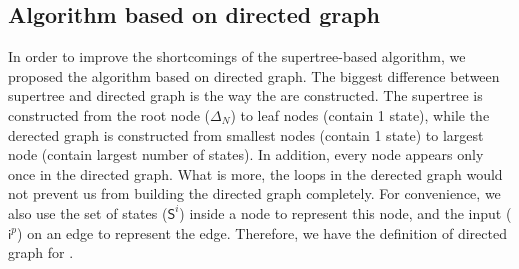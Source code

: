 \subsection{Algorithm based on directed graph}
In order to improve the shortcomings of the supertree-based algorithm, we proposed the algorithm based on directed graph. The biggest difference between supertree and directed graph is the way the are constructed. The supertree is constructed from the root node ($\Delta_N$) to leaf nodes (contain 1 state), while the derected graph is constructed from smallest nodes (contain 1 state) to largest node (contain largest number of states). In addition, every node appears only once in the directed graph. What is more, the loops in the derected graph would not prevent us from building the directed graph completely. For convenience, we also use the set of states ($\mathsf{S}^i$) inside a node to represent this node, and the input ($\mathsf{i}^p$) on an edge to represent the edge.
Therefore, we have the definition of directed graph for \BCNs.
